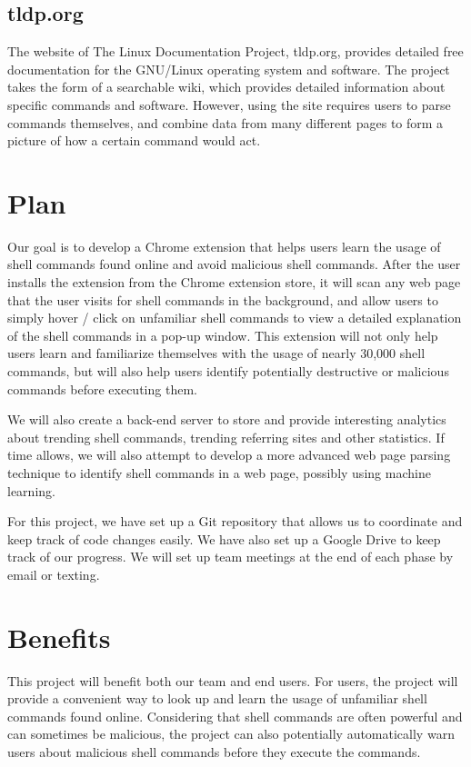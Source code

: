\documentclass[11pt]{article}
\begin{document}
\subsection{tldp.org}

The website of The Linux Documentation Project, tldp.org, provides detailed free documentation for the GNU/Linux operating system and software. The project takes the form of a searchable wiki, which provides detailed information about specific commands and software. However, using the site requires users to parse commands themselves, and combine data from many different pages to form a picture of how a certain command would act.

\section{Plan}

Our goal is to develop a Chrome extension that helps users learn the usage of shell commands found online and avoid malicious shell commands. After the user installs the extension from the Chrome extension store, it will scan any web page that the user visits for shell commands in the background, and allow users to simply hover / click on unfamiliar shell commands to view a detailed explanation of the shell commands in a pop-up window. This extension will not only help users learn and familiarize themselves with the usage of nearly 30,000 shell commands, but will also help users identify potentially destructive or malicious commands before executing them. 

We will also create a back-end server to store and provide interesting analytics about trending shell commands, trending referring sites and other statistics. If time allows, we will also attempt to develop a more advanced web page parsing technique to identify shell commands in a web page, possibly using machine learning.

For this project, we have set up a Git repository that allows us to coordinate and keep track of code changes easily. We have also set up a Google Drive to keep track of our progress. We will set up team meetings at the end of each phase by email or texting.

\section{Benefits}

This project will benefit both our team and end users. For users, the project will provide a convenient way to look up and learn the usage of unfamiliar shell commands found online. Considering that shell commands are often powerful and can sometimes be malicious, the project can also potentially automatically warn users about malicious shell commands before they execute the commands. 
\end{document}
